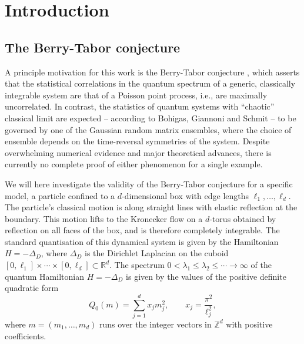 \documentclass[12pt]{amsart}
\theoremstyle{definition}
\theoremstyle{remark}
\numberwithin{equation}{section}
\newcommand{\R}{\mathbb{R}}
\newcommand{\Z}{\mathbb{Z}}
\begin{document}
\maketitle



\section{Introduction}
\label{sec:intro}

\subsection{The Berry-Tabor conjecture}

A principle motivation for this work is the Berry-Tabor conjecture \cite{BerryTabor1977}, which asserts that the statistical correlations in the quantum spectrum of a generic, classically integrable system are that of a Poisson point process, i.e., are maximally uncorrelated. In contrast, the statistics of quantum systems with ``chaotic'' classical limit are expected -- according to Bohigas, Giannoni and Schmit \cite{BGS1984} -- to be governed by one of the Gaussian random matrix ensembles, where the choice of ensemble depends on the time-reversal symmetries of the system. Despite overwhelming numerical evidence and major theoretical advances, there is currently no complete proof of either phenomenon for a single example. 

We will here investigate the validity of the Berry-Tabor conjecture for a specific model, a particle confined to a $d$-dimensional box with edge lengths $\ell_1,\ldots,\ell_d$. The particle's classical motion is along straight lines with elastic reflection at the boundary. This motion lifts to the Kronecker flow on a $d$-torus obtained by reflection on all faces of the box, and is therefore completely integrable. The standard quantisation of this dynamical system is given by the Hamiltonian $H=-\Delta_D$, where $\Delta_D$ is the Dirichlet Laplacian on the cuboid $[0,\ell_1]\times\cdots\times[0,\ell_d]\subset\R^d$. 
The spectrum 
$0<\lambda_1\leq\lambda_2\leq \cdots \to\infty$ of the quantum Hamiltonian $H=-\Delta_D$ is given by the values of the positive definite quadratic form
\begin{equation}\label{Q0}
Q_0(m) = \sum_{j=1}^d  x_j m_j^2 , \qquad x_j = \frac{\pi^2}{\ell_j^2}, 
\end{equation}
where $m=(m_1,\ldots,m_d)$ runs over the integer vectors in $\Z^d$ with positive coefficients. 
\end{document}
